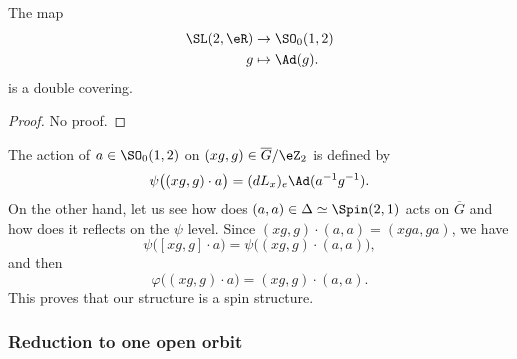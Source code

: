 \begin{lemma}
The map
\begin{equation}
\begin{aligned}
 \SL(2,\eR)&\to \SO_{0}(1,2)\\
   g&\mapsto\Ad(g).
\end{aligned}
\end{equation}
is a double covering.
\end{lemma}
\begin{proof}
No proof.
\end{proof}
The action of $a\in\SO_{0}(1,2)$ on $(xg,g)\in\overline{G}/\eZ_{2}$ is defined by
\begin{equation}
\psi\big( (xg,g)\cdot a \big)=(dL_{x})_{e}\Ad(a^{-1}g^{-1}).
\end{equation}
On the other hand, let us see how does $(a,a)\in\Delta\simeq \Spin(2,1)$ acts on $\overline{G}$ and how does it reflects on the $\psi$ level. Since $(xg,g)\cdot (a,a)=(xga,ga)$, we have
\[ 
  \psi\big( [xg,g]\cdot a \big)=\psi\big( (xg,g)\cdot(a,a) \big),
\]
and then
\[ 
  \varphi\big( (xg,g)\cdot a \big)=(xg,g)\cdot(a,a).
\]
This proves that our structure is a spin structure.

\subsubsection{Reduction to one open orbit}

